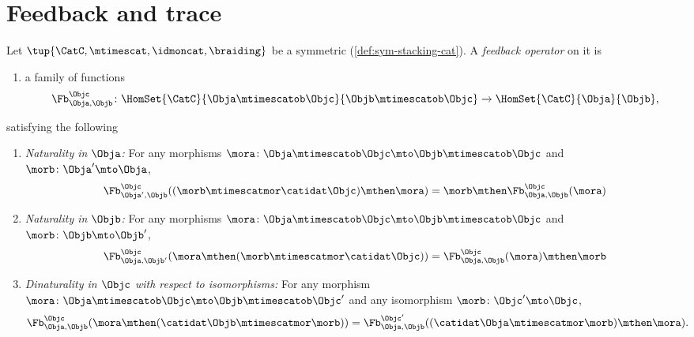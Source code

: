 
\section{Feedback and trace}
\label{sec:feedback-categories}



\begin{ctdefinition}
    \label{def:feedback-cat}
    Let $\tup{\CatC, \mtimescat, \idmoncat, \braiding}$ be a symmetric  (\cref{def:sym-stacking-cat}). A \emph{feedback operator} on it is
    \constit
    \begin{enumerate} 
    \item a family of functions
    \begin{equation}
        \Fb_{\Obja,\Objb}^\Objc\colon \HomSet{\CatC}{\Obja \mtimescatob \Objc}{\Objb\mtimescatob \Objc}\to \HomSet{\CatC}{\Obja}{\Objb},
    \end{equation}
    \end{enumerate}
    satisfying the following
    
    \condit
    \begin{enumerate}
        \item \emph{Naturality in $\Obja$:} For any morphisms $\mora\colon \Obja\mtimescatob \Objc \mto \Objb\mtimescatob \Objc$ and $\morb \colon \Obja' \mto \Obja$,
              \begin{equation}\label{eq:feedback-naturality-1}
                  \Fb_{\Obja', \Objb}^\Objc ( (\morb \mtimescatmor \catidat\Objc) \mthen \mora) = \morb \mthen \Fb_{\Obja, \Objb}^\Objc (\mora)
              \end{equation}
        \item \emph{Naturality in $\Objb$:} For any morphisms $\mora\colon \Obja\mtimescatob \Objc \mto \Objb\mtimescatob \Objc$ and $\morb \colon \Objb \mto \Objb'$,
              \begin{equation}\label{eq:feedback-naturality-2}
                  \Fb_{\Obja, \Objb'}^\Objc ( \mora \mthen (\morb \mtimescatmor \catidat\Objc) ) = \Fb_{\Obja, \Objb}^\Objc (\mora) \mthen \morb
              \end{equation}
        \item \emph{Dinaturality in $\Objc$ with respect to isomorphisms:}
              For any morphism $\mora \colon \Obja  \mtimescatob \Objc \mto \Objb \mtimescatob \Objc'$ and any isomorphism $\morb \colon \Objc' \mto \Objc$,
              \begin{equation}\label{eq:feedback-dinaturality}
                  \Fb_{\Obja, \Objb}^{\Objc} (\mora \mthen (\catidat\Objb \mtimescatmor \morb)) = \Fb_{\Obja, \Objb}^{\Objc'}((\catidat\Obja \mtimescatmor \morb) \mthen \mora).
              \end{equation}


\end{enumerate}
\end{ctdefinition}
